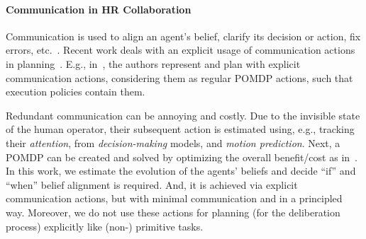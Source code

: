 \documentclass[letterpaper]{article} %
\begin{document}

\paragraph{Communication in HR Collaboration}
Communication 
is used to align an agent's belief, clarify its decision or action, fix errors, etc.~\cite{tellex2014asking,sebastiani2017dealing}. 
Recent work deals with an explicit usage of communication actions in planning~\cite{BuisanSA20,nikolaidis2018planning,roncone2017transparent,sanelli2017short,UnhelkarLS20}. 
E.g., in~\cite{roncone2017transparent,UnhelkarLS20}, the authors represent and plan with explicit communication actions, considering them as regular POMDP actions, such that execution policies contain them. 

Redundant communication can be annoying and costly. Due to the invisible state of the human operator, their subsequent action is estimated using, e.g., tracking their \textit{attention}, from   \textit{decision-making} models, and \textit{motion prediction}. 
Next, a POMDP can be created and solved by optimizing the overall benefit/cost as in~\cite{UnhelkarLS20}. 
In this work, 
we estimate the evolution of the agents' beliefs and decide ``if'' and ``when'' belief alignment is required. And, it is achieved via explicit communication actions, 
but with minimal communication and in a principled way. Moreover, we do not use these actions for planning (for the deliberation process) explicitly like (non-) primitive tasks.    
\end{document}
